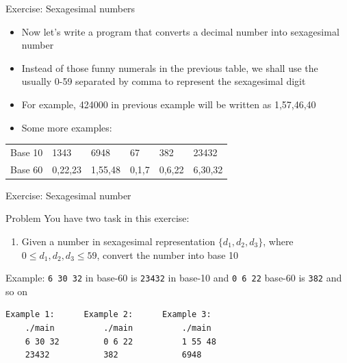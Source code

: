 \documentclass[10pt,xcolor={table,dvipsnames},t]{beamer}
\begin{document}
\begin{frame}{Exercise: Sexagesimal numbers}
  \begin{itemize}
    \item Now let's write a program that converts a decimal number into sexagesimal number
    \item Instead of those funny numerals in the previous table, we shall use the usually 0-59 separated by comma to represent the sexagesimal digit
    \item For example, 424000 in previous example will be written as {1,57,46,40}
    \item Some more examples:
  \end{itemize}
  \begin{table}[]
    \begin{tabular}{llllll}
    Base 10 & 1343    & 6948    & 67    & 382    & 23432   \\
    Base 60 & 0,22,23 & 1,55,48 & 0,1,7 & 0,6,22 & 6,30,32
    \end{tabular}
    \end{table}
\end{frame}

\begin{frame}[fragile]{Exercise: Sexagesimal number}
  \begin{exampleblock}{Problem}
    You have two task in this exercise:
      \begin{enumerate}
        \item Given a number in sexagesimal representation $\{d_1,d_2,d_3\}$, where $0\leq d_1,d_2,d_3\leq 59$, convert the number into base 10
      \end{enumerate}
  \end{exampleblock}
  \begin{exampleblock}{Example:}
    \texttt{6 30 32} in base-60 is \texttt{23432} in base-10 and \texttt{0 6 22} base-60 is \texttt{382} and so on
\begin{lstlisting}[language=bash]
    Example 1:      Example 2:      Example 3:
    ./main          ./main          ./main
    6 30 32         0 6 22          1 55 48
    23432           382             6948
\end{lstlisting} 
\end{exampleblock}
  
\end{frame}
\end{document}
